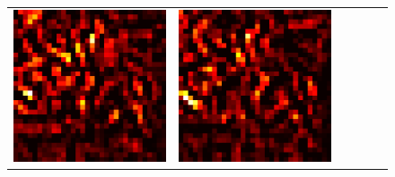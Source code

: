 \documentclass[preprint,12pt]{elsarticle}
\begin{document}
\begin{figure}[p]
\begin{tabular}{cccccc}
  \includegraphics[scale=\scale]{../visualizations/examples/cifar10/resnet18/positive_saliency_map/7.png} & 
  \includegraphics[scale=\scale]{../visualizations/examples/cifar10/resnet18/negative_saliency_map/7.png} & 

\end{tabular}
\end{figure}
\end{document}
